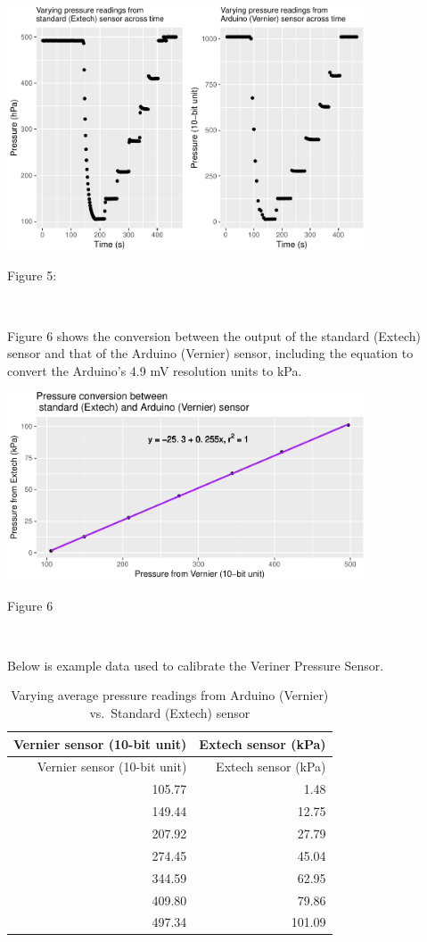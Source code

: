 \documentclass[12pt,]{article}
\begin{document}
\begin{flushleft}\includegraphics[width=400px]{paper_files/figure-latex/vernier_calibration-1} \end{flushleft}

Figure 5:

~

Figure 6 shows the conversion between the output of the standard
(Extech) sensor and that of the Arduino (Vernier) sensor, including the
equation to convert the Arduino's 4.9 mV resolution units to kPa.

\begin{center}\includegraphics[width=400px]{paper_files/figure-latex/vernier_cal2-1} \end{center}

Figure 6

~

Below is example data used to calibrate the Veriner Pressure Sensor.

\begin{longtable}[]{@{}rr@{}}
\caption{Varying average pressure readings from Arduino (Vernier)
vs.~Standard (Extech) sensor}\tabularnewline
\toprule
Vernier sensor (10-bit unit) & Extech sensor (kPa)\tabularnewline
\midrule
\endfirsthead
\toprule
Vernier sensor (10-bit unit) & Extech sensor (kPa)\tabularnewline
\midrule
\endhead
105.77 & 1.48\tabularnewline
149.44 & 12.75\tabularnewline
207.92 & 27.79\tabularnewline
274.45 & 45.04\tabularnewline
344.59 & 62.95\tabularnewline
409.80 & 79.86\tabularnewline
497.34 & 101.09\tabularnewline
\bottomrule
\end{longtable}
\end{document}
